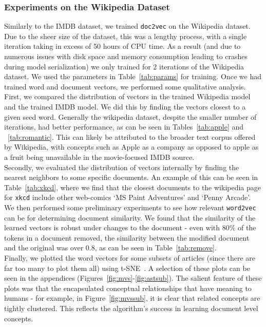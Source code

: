 \documentclass[11pt]{article}
\begin{document}
  \subsubsection*{Experiments on the Wikipedia Dataset}
    Similarly to the IMDB dataset, we trained \texttt{doc2vec} on the Wikipedia
    dataset. Due to the sheer size of the dataset, this was a lengthy process, with
    a single iteration taking in excess of 50 hours of CPU time. As a result (and due
    to numerous issues with disk space and memory consumption leading to crashes
    during model serialization) we only trained for 2 iterations of the Wikipedia
    dataset. We used the parameters in Table~\ref{tab:params} for training. Once we had
    trained word and document vectors, we performed some qualitative analysis.\\
    First, we compared the distribution of vectors in the trained Wikipedia
    model and the trained IMDB model. We did this by finding the vectors closest to
    a given seed word. Generally the wikipedia dataset, despite the smaller number of
    iterations, had better performance, as can be seen in Tables~\ref{tab:apple} and
    ~\ref{tab:romantic}. This can likely be attributed to the broader text corpus
    offered by Wikipedia, with concepts such as Apple as a company as opposed to apple
    as a fruit being unavailable in the movie-focused IMDB source.\\
    Secondly, we evaluated the distribution of vectors internally by finding the nearest
    neighbors to some specific documents. An example of this can be seen in
    Table~\ref{tab:xkcd}, where we find that the closest documents to the wikipedia page
    for \texttt{xkcd} include other web-comics `MS Paint Adventures' and `Penny Arcade'.\\
    We then performed some preliminary experiments to see how relevant \texttt{word2vec}
    can be for determining document similarity. We found that the similarity of the
    learned vectors is robust under changes to the document - even with 80\% of the
    tokens in a document removed, the similarity between the modified document and the
    original was over 0.8, as can be seen in Table~\ref{tab:remove}.\\
    Finally, we plotted the word vectors for some subsets of articles (since there are
    far too many to plot them all) using t-SNE~\cite{maaten2008visualizing}.
    A selection of these plots can be seen in the appendices
    (Figures~\ref{fig:mvs}-\ref{fig:astsub}). The salient feature of these plots was that
    the encapsulated conceptual relationships that have meaning to humans - for example,
    in Figure~\ref{fig:mvssub}, it is clear that related concepts are tightly clustered.
    This reflects the algorithm's success in learning document level concepts.
\end{document}
